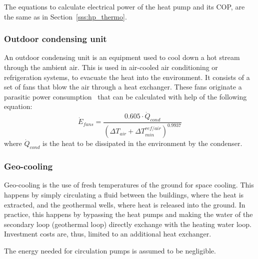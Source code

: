 \documentclass{article}
\begin{document}
The equations to calculate electrical power of the heat pump and its COP, are the same as in Section~\ref{sss:hp_thermo}.

\subsubsection{Outdoor condensing unit}\label{sss:cooling_tower}
An outdoor condensing unit is an equipment used to cool down a hot stream through the ambient air. This is used in air-cooled air conditioning or refrigeration systems, to evacuate the heat into the environment. It consists of a set of fans that blow the air through a heat exchanger. These fans originate a parasitic power consumption~\cite{henchozPotentialRefrigerantBased2016} that can be calculated with help of the following equation:
\begin{equation}
\dot{E}_{fans} = \frac{0.605 \cdot \dot{Q}_{cond}}{( \Delta T_{air} + \Delta T_{min}^{ref/air})^{0.9937}}
\end{equation}
where $\dot{Q}_{cond}$ is the heat to be dissipated in the environment by the condenser. 


\subsubsection{Geo-cooling}
Geo-cooling is the use of fresh temperatures of the ground for space cooling. This happens by simply circulating a fluid between the buildings, where the heat is extracted, and the geothermal wells, where heat is released into the ground. In practice, this happens by bypassing the heat pumps and making the water of the secondary loop (geothermal loop) directly exchange with the heating water loop. Investment costs are, thus, limited to an additional heat exchanger. 

The energy needed for circulation pumps is assumed to be negligible. 
\end{document}

